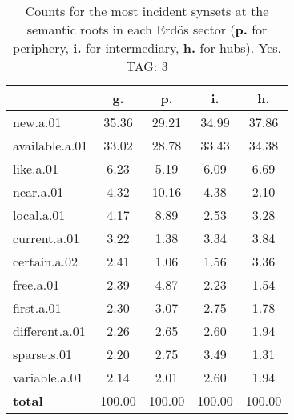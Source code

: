 \begin{table}[h!]
\begin{center}
\begin{tabular}{| l || c | c | c | c |}\hline
 & {\bf g.} & {\bf p.} & {\bf i.} & {\bf h.} \\\hline\hline
new.a.01 & 35.36  & 29.21  & 34.99  & 37.86 \\\hline
available.a.01 & 33.02  & 28.78  & 33.43  & 34.38 \\\hline
like.a.01 & 6.23  & 5.19  & 6.09  & 6.69 \\\hline
near.a.01 & 4.32  & 10.16  & 4.38  & 2.10 \\\hline
local.a.01 & 4.17  & 8.89  & 2.53  & 3.28 \\\hline
current.a.01 & 3.22  & 1.38  & 3.34  & 3.84 \\\hline
certain.a.02 & 2.41  & 1.06  & 1.56  & 3.36 \\\hline
free.a.01 & 2.39  & 4.87  & 2.23  & 1.54 \\\hline
first.a.01 & 2.30  & 3.07  & 2.75  & 1.78 \\\hline
different.a.01 & 2.26  & 2.65  & 2.60  & 1.94 \\\hline
sparse.s.01 & 2.20  & 2.75  & 3.49  & 1.31 \\\hline
variable.a.01 & 2.14  & 2.01  & 2.60  & 1.94 \\\hline\hline
{{\bf total}} & 100.00  & 100.00  & 100.00  & 100.00 \\\hline
\end{tabular}
\caption{Counts for the most incident synsets at the semantic roots in each Erd\"os sector ({\bf p.} for periphery, {\bf i.} for intermediary, {\bf h.} for hubs). Yes. TAG: 3}
\end{center}
\end{table}